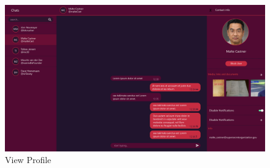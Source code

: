 \begin{figure}[h]
    \centering
    \includegraphics[width=1.0\textwidth]{./graphics/wireframes/ViewProfile}
    \caption{View Profile}
    \label{fig:figure30}
\end{figure}
